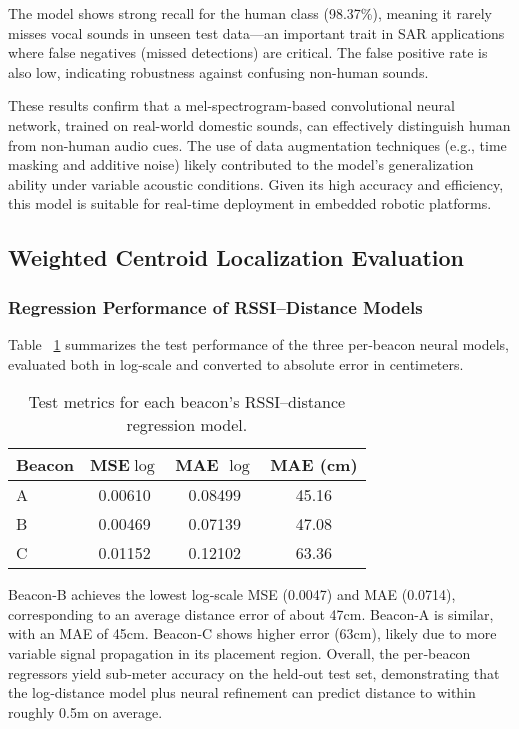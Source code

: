 The model shows strong recall for the human class (98.37\%), meaning it rarely misses vocal sounds in unseen test data—an important trait in SAR applications where false negatives (missed detections) are critical. The false positive rate is also low, indicating robustness against confusing non-human sounds.

These results confirm that a mel-spectrogram-based convolutional neural network, trained on real-world domestic sounds, can effectively distinguish human from non-human audio cues. The use of data augmentation techniques (e.g., time masking and additive noise) likely contributed to the model's generalization ability under variable acoustic conditions. Given its high accuracy and efficiency, this model is suitable for real-time deployment in embedded robotic platforms.

\subsection{Weighted Centroid Localization Evaluation}

\subsubsection{Regression Performance of RSSI–Distance Models}

Table ~\ref{tab:beacon_metrics} summarizes the test performance of the three per‑beacon neural models, evaluated both in log‑scale and converted to absolute error in centimeters.

\begin{table}[ht]
\centering
\caption{Test metrics for each beacon’s RSSI–distance regression model.}
\label{tab:beacon_metrics}
\begin{tabular}{lccc}
\toprule
\textbf{Beacon} & \textbf{MSE$ {\log}$} & \textbf{MAE ${\log}$} & \textbf{MAE (cm)} \\
\midrule
A & 0.00610 & 0.08499 & 45.16 \\
B & 0.00469 & 0.07139 & 47.08 \\
C & 0.01152 & 0.12102 & 63.36 \\
\bottomrule
\end{tabular}
\end{table}

Beacon-B achieves the lowest log‑scale MSE (0.0047) and MAE (0.0714), corresponding to an average distance error of about 47cm. Beacon-A is similar, with an MAE of 45cm. Beacon-C shows higher error (63cm), likely due to more variable signal propagation in its placement region. Overall, the per‑beacon regressors yield sub‑meter accuracy on the held‑out test set, demonstrating that the log‑distance model plus neural refinement can predict distance to within roughly 0.5m on average.

